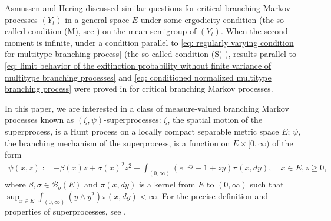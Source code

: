 \documentclass[12pt,a4paper]{amsart}
\theoremstyle{definition}
\numberwithin{equation}{section}
\begin{document}
Asmussen and Hering \cite[Sections~6.3~and~6.4]{AsmussenHering1983Branching} discussed similar questions for critical branching Markov processes $(Y_t)$ in a general space $E$ under some ergodicity condition (the so-called condition (M), see \cite[p.~156]{AsmussenHering1983Branching}) on the mean semigroup of $(Y_t)$.
When the second moment is infinite, under a condition  parallel  to \eqref{eq: regularly varying condition for multitype branching process} (the so-called condition (S) \cite[p.~207]{AsmussenHering1983Branching}), results parallel to \eqref{eq: limit behavior of the exitinction probability without finite variance of multitype branching processes} and \eqref{eq: conditioned normalized multitype branching process} were proved in \cite[Theorem~6.4.2]{AsmussenHering1983Branching} for critical branching Markov processes.

In this paper, we are interested in a class of measure-valued branching Markov processes known as $(\xi, \psi)$-superprocesses:
$\xi$, the spatial motion of the superprocess, is a Hunt process on a locally compact separable metric space $E$;
$\psi$, the branching mechanism of the superprocess, is a function on $E \times [0,\infty)$ of the form
\begin{align} 
\label{eq: branching mechanism}
	\psi(x,z):=
	- \beta(x) z + \sigma (x)^2 z^2 + \int_{(0,\infty)} (e^{-zy} - 1 + zy) \pi(x,dy),
	\quad x\in E, z\geq 0,
\end{align}
where $\beta, \sigma\in \mathscr B_b(E)$ and $\pi(x,dy)$ is a kernel from $E$ to $(0,\infty)$ such that $\sup_{x\in E} \int_{(0,\infty)} (y\wedge y^2) \pi(x,dy) < \infty$.
For the precise definition and properties of superprocesses, see \cite{Li2011Measure-valued}.
\end{document}
